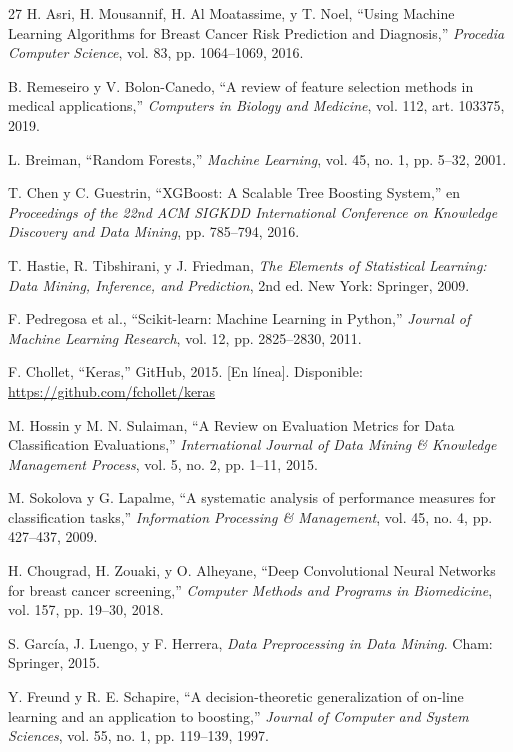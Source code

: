 \documentclass[journal]{IEEEtran}
\begin{document}
\begin{thebibliography}{27}
H. Asri, H. Mousannif, H. Al Moatassime, y T. Noel, ``Using Machine Learning Algorithms for Breast Cancer Risk Prediction and Diagnosis,'' \textit{Procedia Computer Science}, vol. 83, pp. 1064--1069, 2016.

B. Remeseiro y V. Bolon-Canedo, ``A review of feature selection methods in medical applications,'' \textit{Computers in Biology and Medicine}, vol. 112, art. 103375, 2019.

L. Breiman, ``Random Forests,'' \textit{Machine Learning}, vol. 45, no. 1, pp. 5--32, 2001.

T. Chen y C. Guestrin, ``XGBoost: A Scalable Tree Boosting System,'' en \textit{Proceedings of the 22nd ACM SIGKDD International Conference on Knowledge Discovery and Data Mining}, pp. 785--794, 2016.

T. Hastie, R. Tibshirani, y J. Friedman, \textit{The Elements of Statistical Learning: Data Mining, Inference, and Prediction}, 2nd ed. New York: Springer, 2009.

F. Pedregosa et al., ``Scikit-learn: Machine Learning in Python,'' \textit{Journal of Machine Learning Research}, vol. 12, pp. 2825--2830, 2011.

F. Chollet, ``Keras,'' GitHub, 2015. [En línea]. Disponible: \url{https://github.com/fchollet/keras}

M. Hossin y M. N. Sulaiman, ``A Review on Evaluation Metrics for Data Classification Evaluations,'' \textit{International Journal of Data Mining \& Knowledge Management Process}, vol. 5, no. 2, pp. 1--11, 2015.

M. Sokolova y G. Lapalme, ``A systematic analysis of performance measures for classification tasks,'' \textit{Information Processing \& Management}, vol. 45, no. 4, pp. 427--437, 2009.

H. Chougrad, H. Zouaki, y O. Alheyane, ``Deep Convolutional Neural Networks for breast cancer screening,'' \textit{Computer Methods and Programs in Biomedicine}, vol. 157, pp. 19--30, 2018.

S. García, J. Luengo, y F. Herrera, \textit{Data Preprocessing in Data Mining}. Cham: Springer, 2015.

Y. Freund y R. E. Schapire, ``A decision-theoretic generalization of on-line learning and an application to boosting,'' \textit{Journal of Computer and System Sciences}, vol. 55, no. 1, pp. 119--139, 1997.


\end{thebibliography}
\end{document}

